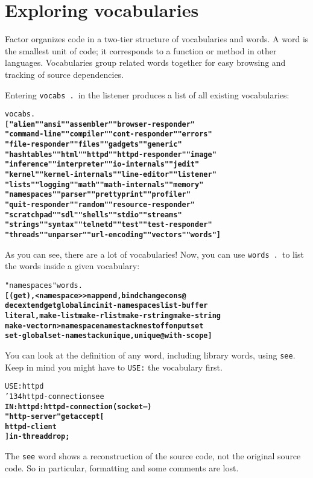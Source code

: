 \documentclass{book}
\newcommand{\bs}{\char'134}
\begin{document}
\section{Exploring vocabularies}\label{exploring-vocabs}

Factor organizes code in a two-tier structure of vocabularies and words. A word is the smallest unit of code; it corresponds to a function or method in other languages. Vocabularies group related words together for easy browsing and tracking of source dependencies.

Entering \texttt{vocabs .}~in the listener produces a list of all existing vocabularies:

\begin{alltt}
  vocabs .
\textbf{[ "alien" "ansi" "assembler" "browser-responder"
"command-line" "compiler" "cont-responder" "errors"
"file-responder" "files" "gadgets" "generic"
"hashtables" "html" "httpd" "httpd-responder" "image"
"inference" "interpreter" "io-internals" "jedit"
"kernel" "kernel-internals" "line-editor" "listener"
"lists" "logging" "math" "math-internals" "memory"
"namespaces" "parser" "prettyprint" "profiler"
"quit-responder" "random" "resource-responder"
"scratchpad" "sdl" "shells" "stdio" "streams"
"strings" "syntax" "telnetd" "test" "test-responder"
"threads" "unparser" "url-encoding" "vectors" "words" ]}
\end{alltt}

As you can see, there are a lot of vocabularies! Now, you can use \texttt{words .}~to list the words inside a given vocabulary:

\begin{alltt}
  "namespaces" words .
\textbf{[ (get) , <namespace> >n append, bind change cons@
dec extend get global inc init-namespaces list-buffer
literal, make-list make-rlist make-rstring make-string
make-vector n> namespace namestack nest off on put set
set-global set-namestack unique, unique@ with-scope ]}
\end{alltt}

You can look at the definition of any word, including library words, using \texttt{see}. Keep in mind you might have to \texttt{USE:} the vocabulary first.

\begin{alltt}
  USE: httpd
  \bs httpd-connection see
\textbf{IN: httpd : httpd-connection ( socket -- )
    "http-server" get accept [
        httpd-client
    ] in-thread drop ;}
\end{alltt}

The \texttt{see} word shows a reconstruction of the source code, not the original source code. So in particular, formatting and some comments are lost.
\end{document}
